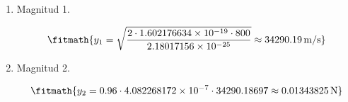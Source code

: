 \begin{enumerate}

\item Magnitud 1.

\[\fitmath{y_{1}=\sqrt{\frac{2\cdot 1.602176634\times10^{-19}\cdot 800}{2.18017156\times10^{-25}}}\approx 34290.19\,\mathrm{m/s}}\]

\item Magnitud 2.

\[\fitmath{y_{2}=0.96\cdot 4.082268172\times10^{-7}\cdot 34290.18697\approx 0.01343825\,\mathrm{N}}\]

\end{enumerate}
